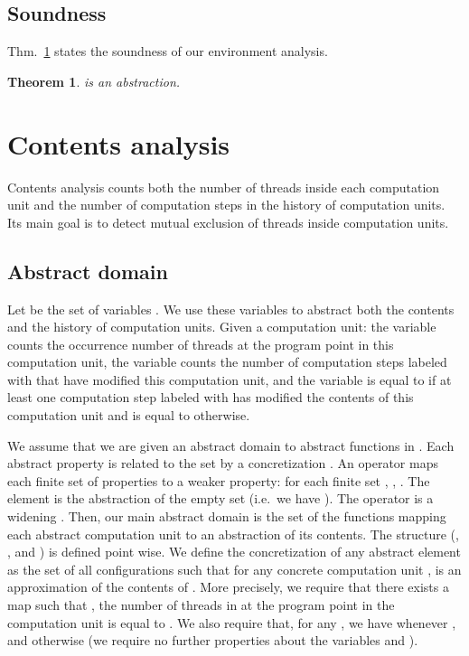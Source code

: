 \documentclass{article}
\newtheorem{theorem}[thm]{Theorem}
\begin{document}
\subsection{Soundness}

Thm.~\ref{envsound} states the soundness of our environment analysis.
\begin{theorem}
\label{envsound} is an abstraction.
\end{theorem}



\section{Contents  analysis}
\label{occurrence}


Contents analysis counts both the number of threads inside each computation unit and the number of computation steps in the history of computation units. 
Its main goal is to detect mutual exclusion of threads inside computation units.

\subsection{Abstract domain}
Let  be the  set of variables .
We use these variables to abstract both the contents and the history of computation units.
Given a computation unit: the variable  counts the occurrence number of threads at the program point   in this computation unit,
 the variable  counts the number of computation steps labeled with  that have modified this computation unit, and the variable  is equal to  if at least one computation step labeled with  has modified the contents of this computation unit and  is equal to  otherwise.

We assume that we are given an abstract domain  to abstract functions in .
Each abstract property is related to the set  by a  concretization .
An operator  maps each finite set of properties to a weaker
property: for each finite set ,
, . 
The element  is the abstraction of the empty set (i.e.~we have ).  The operator  is a widening \cite{cc:galois-widening}.
Then, our main  abstract domain 
 is the set  of the functions mapping each abstract computation unit to an abstraction of its contents.
The structure (, , and )  is defined point wise. 
We define the concretization  of any abstract element  as the set of  all configurations  such that for any concrete computation unit ,  is an approximation of the contents of . More precisely, we require that there exists  a map   such that , the number of  threads in  at the program point   in the computation unit  is equal to . We also require that, for any , we have  whenever , and   otherwise (we require no further properties about the variables  and ).
\end{document}
